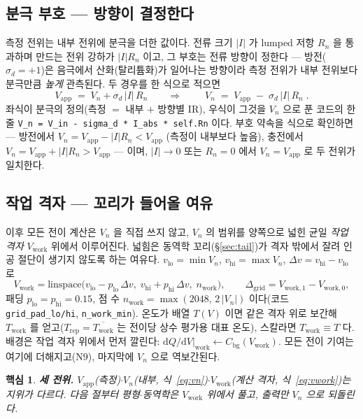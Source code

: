 \documentclass[11pt,a4paper]{article}
\newtheorem*{keybox}{핵심}
\newcommand{\dd}{\mathrm{d}}
\newcommand{\app}{\mathrm{app}}
\newcommand{\bg}{\mathrm{bg}}
\newcommand{\work}{\mathrm{work}}
\newcommand{\code}[1]{\texttt{#1}}
\begin{document}
\subsection{분극 부호 — 방향이 결정한다}
측정 전위는 내부 전위에 분극을 더한 값이다. 전류 크기 $|I|$ 가 lumped 저항 $R_n$ 을 통과하며 만드는 전위 강하가
$|I|R_n$ 이고, 그 부호는 전류 방향이 정한다 --- 방전($\sigma_d=+1$)은 음극에서 산화(탈리튬화)가 일어나는 방향이라
측정 전위가 내부 전위보다 분극만큼 \emph{높게} 관측된다. 두 경우를 한 식으로 적으면
\begin{equation}
V_\app\;=\;V_n+\sigma_d\,|I|\,R_n
\qquad\Longrightarrow\qquad
\boxed{\;V_n\;=\;V_\app\;-\;\sigma_d\,|I|\,R_n\;.}
\label{eq:vn}
\end{equation}
좌식이 분극의 정의(측정 $=$ 내부 $+$ 방향별 IR), 우식이 그것을 $V_n$ 으로 푼 코드의 한 줄
\code{V\_n = V\_in - sigma\_d * I\_abs * self.Rn} 이다. 부호 약속을 식으로 확인하면 --- 방전에서 $V_n=V_\app-|I|R_n<V_\app$
(측정이 내부보다 높음), 충전에서 $V_n=V_\app+|I|R_n>V_\app$ --- 이며, $|I|\to0$ 또는 $R_n=0$ 에서 $V_n=V_\app$ 로
두 전위가 일치한다.

\subsection{작업 격자 — 꼬리가 들어올 여유}
이후 모든 전이 계산은 $V_n$ 을 직접 쓰지 않고, $V_n$ 의 범위를 양쪽으로 넓힌 균일 \emph{작업 격자} $V_\work$ 위에서
이루어진다. 넓힘은 동역학 꼬리(\S\ref{sec:tail})가 격자 밖에서 잘려 인공 절단이 생기지 않도록 하는 여유다.
$v_\mathrm{lo}=\min V_n$, $v_\mathrm{hi}=\max V_n$, $\Delta v=v_\mathrm{hi}-v_\mathrm{lo}$ 로
\begin{equation}
V_\work=\mathrm{linspace}\big(v_\mathrm{lo}-p_\mathrm{lo}\,\Delta v,\;
v_\mathrm{hi}+p_\mathrm{hi}\,\Delta v,\;n_\work\big),
\qquad \Delta_\mathrm{grid}=V_{\work,1}-V_{\work,0},
\label{eq:vwork}
\end{equation}
패딩 $p_\mathrm{lo}=p_\mathrm{hi}=0.15$, 점 수 $n_\work=\max(2048,\,2\,|V_n|)$ 이다(코드 \code{grid\_pad\_lo/hi},
\code{n\_work\_min}). 온도가 배열 $T(V)$ 이면 같은 격자 위로 보간해 $T_\work$ 를 얻고($T_\mathrm{rep}=\overline{T_\work}$ 는
전이당 상수 평가용 대표 온도), 스칼라면 $T_\work\equiv T$ 다. 배경은 작업 격자 위에서 먼저 깔린다:
$\dd Q/\dd V|_\work \leftarrow C_\bg(V_\work)$. 모든 전이 기여는 여기에 더해지고($\mathrm N9$), 마지막에 $V_n$ 으로
역보간된다.

\begin{keybox}
\textbf{세 전위.} $V_\app$(측정)$\cdot$$V_n$(내부, 식~\eqref{eq:vn})$\cdot$$V_\work$(계산 격자, 식~\eqref{eq:vwork})는
지위가 다르다. 다음 절부터 평형$\cdot$동역학은 $V_\work$ 위에서 풀고, 출력만 $V_n$ 으로 되돌린다.
\end{keybox}
\end{document}
